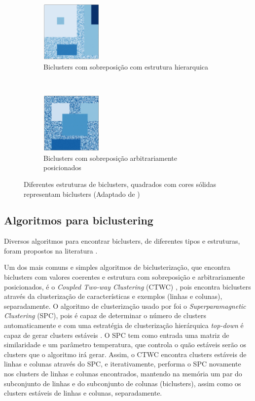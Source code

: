 \documentclass[normaltoc, espacoumemeio, pnumromarab,ruledheader]{abnt}
\begin{document}
\begin{figure}[h]
        ~
        \centering
        \begin{subfigure}[b]{0.3\textwidth}
                \includegraphics[width=30mm]{img/h-bic-struct.png}
                \caption{Biclusters com sobreposição com estrutura hierarquica}
                \label{fig:bicstruct-h}
        \end{subfigure}
        ~
        \centering
        \begin{subfigure}[b]{0.3\textwidth}
                \includegraphics[width=30mm]{img/i-bic-struct.png}
                \caption{Biclusters com sobreposição arbitrariamente posicionados}
                \label{fig:bicstruct-i}
        \end{subfigure}
        \caption{Diferentes estruturas de biclusters, quadrados com cores sólidas representam biclusters (Adaptado de \cite{Madeira2004})}
        \label{fig:bicstruct}
	\end{figure}
	
	\subsection{Algoritmos para biclustering}

	Diversos algoritmos para encontrar biclusters, de diferentes tipos e estruturas, foram propostos na literatura \cite{Tanay2005,Madeira2004}.
	
	Um dos mais comuns e simples algoritmos de biclusterização, que encontra biclusters com valores coerentes e estrutura com sobreposição e arbitrariamente posicionados, é o \textit{Coupled Two-way Clustering} (CTWC) \cite{Getz2000}, pois encontra biclusters através da clusterização de características e exemplos (linhas e colunas), separadamente.
	O algoritmo de clusterização usado por \cite{Getz2000} foi o \textit{Superparamagnetic Clustering} (SPC), pois é capaz de determinar o número de clusters automaticamente e com uma estratégia de clusterização hierárquica \textit{top-down} é capaz de gerar clusters estáveis \cite{Getz2000}.
	O SPC tem como entrada uma matriz de similaridade e um parâmetro temperatura, que controla o quão estáveis serão os clusters que o algoritmo irá gerar.
	Assim, o CTWC encontra clusters estáveis de linhas e colunas através do SPC, e iterativamente, performa o SPC novamente nos clusters de linhas e colunas encontrados, mantendo na memória um par do subconjunto de linhas e do subconjunto de colunas (biclusters), assim como os clusters estáveis de linhas e colunas, separadamente.
\end{document}
